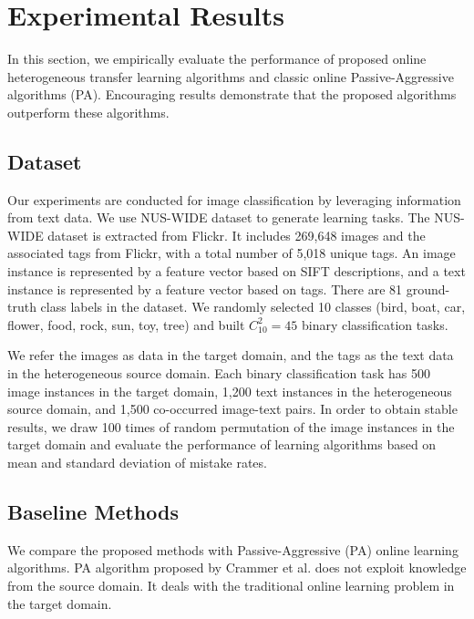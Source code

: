 \documentclass[twocolumn]{article}
\begin{document}
\section{Experimental Results}

In this section, we empirically evaluate the performance of proposed online heterogeneous transfer learning algorithms and classic online Passive-Aggressive algorithms (PA).
Encouraging results demonstrate that the proposed algorithms outperform these algorithms.

\subsection{Dataset}
Our experiments are conducted for image classification by leveraging information from text data.
We use NUS-WIDE dataset to generate learning tasks.
The NUS-WIDE dataset is extracted from Flickr.
It includes 269,648 images and the associated tags from Flickr, with a total number of 5,018 unique tags.
An image instance is represented by a feature vector based on SIFT descriptions, and a text instance is represented by a feature vector based on tags.
There are 81 ground-truth class labels in the dataset.
We randomly selected 10 classes (bird, boat, car, flower, food, rock, sun, toy, tree) and built $C_{10}^{2} = 45$ binary classification tasks.

We refer the images as data in the target domain, and the tags as the text data in the heterogeneous source domain.
Each binary classification task has 500 image instances in the target domain, 1,200 text instances in the heterogeneous source domain, and 1,500 co-occurred image-text pairs.
In order to obtain stable results, we draw 100 times of random permutation of the image instances in the target domain and evaluate the performance of learning algorithms based on mean and standard deviation of mistake rates.


\subsection{Baseline Methods}
We compare the proposed methods with Passive-Aggressive (PA) online learning algorithms.
PA algorithm proposed by Crammer et al. does not exploit knowledge from the source domain.
It deals with the traditional online learning problem in the target domain.
\end{document}
